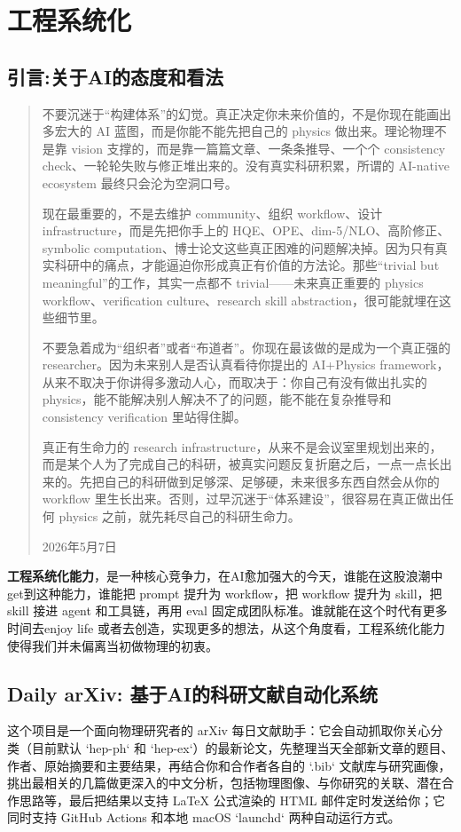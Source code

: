 \chapter{工程系统化}
\section{引言:关于AI的态度和看法}
\begin{quotation}
不要沉迷于“构建体系”的幻觉。真正决定你未来价值的，不是你现在能画出多宏大的 AI 蓝图，而是你能不能先把自己的 physics 做出来。理论物理不是靠 vision 支撑的，而是靠一篇篇文章、一条条推导、一个个 consistency check、一轮轮失败与修正堆出来的。没有真实科研积累，所谓的 AI-native ecosystem 最终只会沦为空洞口号。

现在最重要的，不是去维护 community、组织 workflow、设计 infrastructure，而是先把你手上的 HQE、OPE、dim-5/NLO、高阶修正、symbolic computation、博士论文这些真正困难的问题解决掉。因为只有真实科研中的痛点，才能逼迫你形成真正有价值的方法论。那些“trivial but meaningful”的工作，其实一点都不 trivial——未来真正重要的 physics workflow、verification culture、research skill abstraction，很可能就埋在这些细节里。

不要急着成为“组织者”或者“布道者”。你现在最该做的是成为一个真正强的 researcher。因为未来别人是否认真看待你提出的 AI+Physics framework，从来不取决于你讲得多激动人心，而取决于：你自己有没有做出扎实的 physics，能不能解决别人解决不了的问题，能不能在复杂推导和 consistency verification 里站得住脚。

真正有生命力的 research infrastructure，从来不是会议室里规划出来的，而是某个人为了完成自己的科研，被真实问题反复折磨之后，一点一点长出来的。先把自己的科研做到足够深、足够硬，未来很多东西自然会从你的 workflow 里生长出来。否则，过早沉迷于“体系建设”，很容易在真正做出任何 physics 之前，就先耗尽自己的科研生命力。

\hfill 2026年5月7日
\end{quotation}

\textbf{工程系统化能力}，是一种核心竞争力，在AI愈加强大的今天，谁能在这股浪潮中get到这种能力，谁能把 prompt 提升为 workflow，把 workflow 提升为 skill，把 skill 接进 agent 和工具链，再用 eval 固定成团队标准。谁就能在这个时代有更多时间去enjoy life 或者去创造，实现更多的想法，从这个角度看，工程系统化能力使得我们并未偏离当初做物理的初衷。


\section{Daily arXiv: 基于AI的科研文献自动化系统}
这个项目是一个面向物理研究者的 arXiv 每日文献助手：它会自动抓取你关心分类（目前默认 `hep-ph` 和 `hep-ex`）的最新论文，先整理当天全部新文章的题目、作者、原始摘要和主要结果，再结合你和合作者各自的 `.bib` 文献库与研究画像，挑出最相关的几篇做更深入的中文分析，包括物理图像、与你研究的关联、潜在合作思路等，最后把结果以支持 LaTeX 公式渲染的 HTML 邮件定时发送给你；它同时支持 GitHub Actions 和本地 macOS `launchd` 两种自动运行方式。
